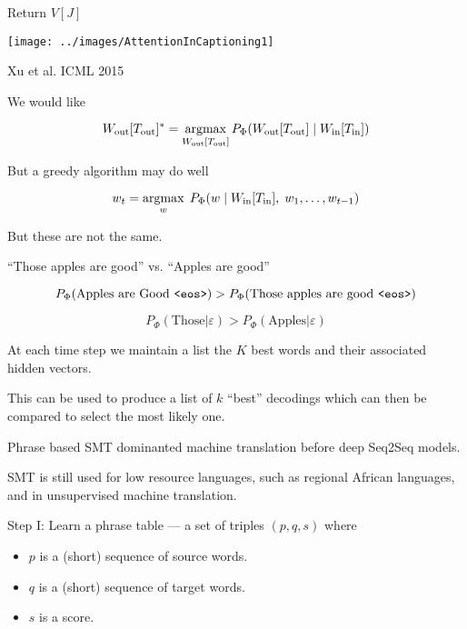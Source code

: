 {\bigskip
Return $V[J]$




\centerline{\texttt{[image: ../images/AttentionInCaptioning1]}}
\centerline{Xu et al. ICML 2015}


We would like

\vfill
$$W_{\mathrm{out}}[T_{\mathrm{out}}]^* = \operatorname*{argmax}_{W_{\mathrm{out}}[T_{\mathrm{out}}]}
P_\Phi(W_{\mathrm{out}}[T_{\mathrm{out}}] \;|\;W_{\mathrm{in}}[T_{\mathrm{in}}])$$

\vfill
But a greedy algorithm may do well

\vfill
$$w_t = \operatorname*{argmax}_w\; P_\Phi(w\;|\;W_{\mathrm{in}}[T_{\mathrm{in}}],\;w_1,\ldots,w_{t-1})$$

\vfill
But these are not the same.


``Those apples are good'' vs. ``Apples are good''

\vfill
$$P_\Phi(\mbox{Apples are Good {\tt <eos>}}) > P_\Phi(\mbox{Those apples are good {\tt <eos>}})$$

\vfill
$$P_\Phi(\mbox{Those}|\varepsilon) > P_\Phi(\mbox{Apples}|\varepsilon)$$
    

At each time step we maintain a list the $K$ best words and their associated hidden vectors.

\vfill
This can be used to produce a list of $k$ ``best'' decodings which can then be compared to select
the most likely one.



Phrase based SMT dominanted machine translation before deep Seq2Seq models.

\vfill
SMT is still used for low resource languages, such as regional African languages, and in unsupervised machine translation.



Step I:   Learn a phrase table --- a set of triples $(p,q,s)$ where

\vfill
\begin{itemize}
\item $p$ is a (short) sequence of source words.
  \vfill
\item $q$ is a (short) sequence of target words.
  \vfill
\item $s$ is a score.
\end{itemize}

}
